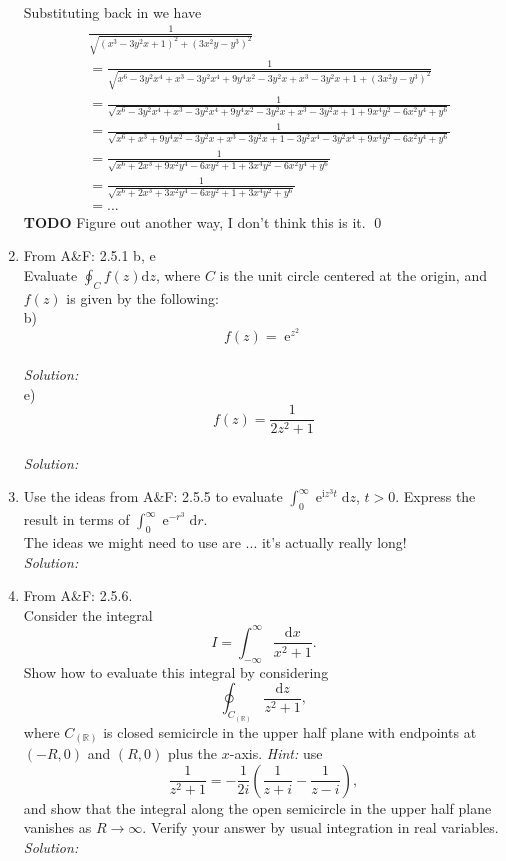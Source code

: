 \documentclass[10pt]{amsart}
\newcommand{\D}{\mathrm{d}}
\newcommand{\I}{\mathrm{i}}
\DeclareMathOperator{\E}{e}
\theoremstyle{nonumberplain}
\begin{document}
\begin{enumerate}[label={\bf {\arabic*}:}]
\begin{align*}
\end{align*}
Substituting back in we have
\begin{align*}
& \frac{1}{\sqrt{\left( x^3 -3y^2x + 1 \right)^2 + \left( 3x^2y - y^3 \right)^2}} \\
	&= \frac{1}{\sqrt{x^6 -3y^2x^4 + x^3 -3y^2x^4 + 9y^4x^2 - 3y^2x +  x^3 -3y^2x + 1 + \left( 3x^2y - y^3 \right)^2}} \\
	&= \frac{1}{\sqrt{x^6 -3y^2x^4 + x^3 -3y^2x^4 + 9y^4x^2 - 3y^2x +  x^3 -3y^2x + 1 + 9x^4y^2 - 6x^2y^4 + y^6 }} \\
	&= \frac{1}{\sqrt{x^6 + x^3 + 9y^4x^2 - 3y^2x +  x^3 -3y^2x + 1 -3y^2x^4 -3y^2x^4 + 9x^4y^2 - 6x^2y^4 + y^6 }} \\
	&= \frac{1}{\sqrt{x^6 + 2x^3 + 9x^2y^4 - 6xy^2 + 1 +3x^4y^2 - 6x^2y^4 + y^6 }} \\
	&= \frac{1}{\sqrt{x^6 + 2x^3 + 3x^2y^4 - 6xy^2 + 1 +3x^4y^2 + y^6 }} \\
	&= ...
\end{align*}
\textbf{TODO} Figure out another way, I don't think this is it.
\qed
\\

\item From A\&F: 2.5.1 b, e \\
Evaluate $\oint_C f(z)\D z$, where $C$ is the unit circle centered at the origin, and $f(z)$ is given by the following: \\
b) $$f(z) = \E^{z^2}$$ \\
\textit{Solution:} \\
e) $$f(z) = \frac{1}{2z^2 + 1} $$ \\
\textit{Solution:} \\
\item Use the ideas from A\&F: 2.5.5 to evaluate $\int_0^\infty \E^{\I
    z^3 t} \D z$, $t > 0$.  Express the result in terms of $\int_0^\infty \E^{-
    r^3} \D r$. \\
The ideas we might need to use are ... it's actually really long! \\
\textit{Solution:}\\
\item From A\&F: 2.5.6. \\
Consider the integral $$I = \int_{-\infty}^{\infty} \frac{\D x}{x^2 + 1}.$$
Show how to evaluate this integral by considering
$$\oint_{C_{(\mathbb R)}} \frac{\D z}{z^2 + 1},$$
where $C_{(\mathbb R)}$ is closed semicircle in the upper half plane with endpoints at $(-R, 0)$ and $(R, 0)$ plus the $x$-axis.
\textit{Hint:} use
$$\frac{1}{z^2 + 1} = -\frac{1}{2i}\left(\frac{1}{z + i} - \frac{1}{z - i}\right),$$
and show that the integral along the open semicircle in the upper half plane vanishes as $R \rightarrow \infty$.
Verify your answer by usual integration in real variables.
\textit{Solution:}\\
\\


\end{enumerate}
\end{document}
